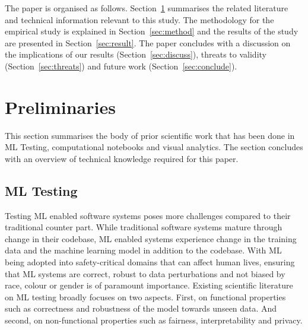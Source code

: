 \documentclass[acmsmall,screen,review,anonymous]{acmart}
\begin{document}
The paper is organised as follows. Section~\ref{sec:prelim} summarises the related literature and technical information relevant to this study. The methodology for the empirical study is explained in Section~\ref{sec:method} and the results of the study are presented in Section~\ref{sec:result}. The paper concludes with a discussion on the implications of our results (Section~\ref{sec:discuss}), threats to validity (Section~\ref{sec:threats}) and future work (Section~\ref{sec:conclude}).

\section{Preliminaries}\label{sec:prelim}
This section summarises the body of prior scientific work that has been done in ML Testing, computational notebooks and visual analytics. The section concludes with an overview of technical knowledge required for this paper.

\subsection{ML Testing}\label{sec:ml-testing}

Testing ML enabled software systems poses more challenges compared to their traditional counter part. While traditional software systems mature through change in their codebase, ML enabled systems experience change in the training data and the machine learning model in addition to the codebase\cite{CITEME}. With ML being adopted into safety-critical domains that can affect human lives, ensuring that ML systems are correct, robust to data perturbations and not biased by race, colour or gender is of paramount importance. Existing scientific literature on ML testing broadly focuses on two aspects. First, on functional properties such as correctness and robustness of the model towards unseen data. And second, on non-functional properties such as fairness, interpretability and privacy.
\end{document}

